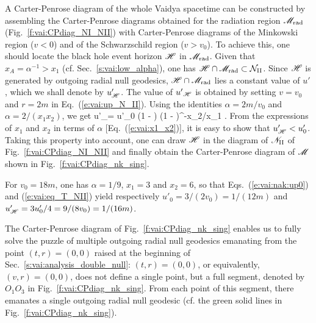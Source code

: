 A Carter-Penrose diagram of the whole Vaidya spacetime can be constructed
by assembling the Carter-Penrose diagrams obtained for the radiation region
$\mathscr{M}_{\rm rad}$ (Fig.~\ref{f:vai:CPdiag_NI_NII}) with Carter-Penrose diagrams of the Minkowski
region ($v<0$) and of the Schwarzschild region ($v> v_0$).
To achieve this, one should locate the black hole event horizon $\mathscr{H}$
in $\mathscr{M}_{\rm rad}$.
Given that $x_A = \alpha^{-1} >  x_1$ (cf. Sec.~\ref{s:vai:low_alpha}),
one has $\mathscr{H}\cap \mathscr{M}_{\rm rad} \subset
\mathcal{N}_{\rm II}$.
Since $\mathscr{H}$ is generated by outgoing radial
null geodesics, $\mathscr{H}\cap \mathscr{M}_{\rm rad}$ lies a constant value of $u'$, which
we shall denote by $u'_{\mathscr{H}}$. The value of ${u'}_{\mathscr{H}}$ is obtained by
setting $v=v_0$ and $r=2m$ in Eq.~(\ref{e:vai:up_N_II}). Using the identities
$\alpha = 2m/v_0$ and $\alpha = 2/(x_1 x_2)$, we get
\be \label{e:vai:nak:upH}
    u'_\Hor = u'_0 \left(1 -  \right)
    \left(1 -  \right)^{-x_2/x_1} .
\ee
From the expressions of $x_1$ and $x_2$ in terms of $\alpha$
[Eq.~(\ref{e:vai:x1_x2})], it is easy to show that $u'_{\mathscr{H}} < u'_0$.
Taking this property into account, one can draw $\mathscr{H}$ in the diagram of $\mathscr{N}_{\rm II}$
of Fig.~\ref{f:vai:CPdiag_NI_NII} and finally obtain
the Carter-Penrose diagram of $\mathscr{M}$ shown in
Fig.~\ref{f:vai:CPdiag_nk_sing}.

\begin{example}
For $v_0 = 18 m$, one has $\alpha = 1/9$, $x_1 = 3$ and $x_2 = 6$, so that Eqs.~(\ref{e:vai:nak:up0})
and (\ref{e:vai:eq_T_NII}) yield respectively
$u'_0 = 3/(2 v_0) = 1/(12 m)$ and
$u'_{\mathscr{H}} = 3 u'_0 / 4=  9/(8 v_0) = 1/(16 m)$.
\end{example}

The Carter-Penrose diagram of Fig.~\ref{f:vai:CPdiag_nk_sing} enables us to fully solve the puzzle of multiple outgoing radial null geodesics emanating from the point $(t,r) = (0,0)$ raised at the beginning of
Sec.~\ref{s:vai:analysis_double_null}: $(t,r) = (0,0)$, or equivalently, $(v, r) = (0,0)$,
does not define a single point, but a full segment, denoted by $O_1 O_3$ in Fig.~\ref{f:vai:CPdiag_nk_sing}. From each point of this segment, there emanates a single outgoing radial null geodesic (cf. the green solid lines in Fig.~\ref{f:vai:CPdiag_nk_sing}).

